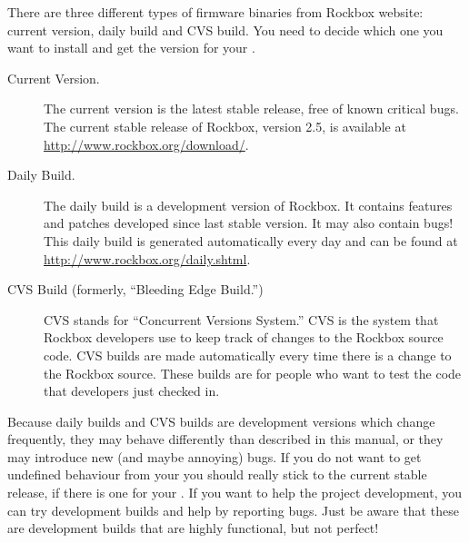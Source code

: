There are three different types of firmware binaries from Rockbox website:
\label{Version}
current version, daily build and CVS build. You need to decide which one
you want to install and get the version for your \dap{}.

\begin{description}

\item[Current Version.] The current version is the latest stable release, free
  of known critical bugs.  The current stable release of Rockbox, version 2.5,
  is available at \url{http://www.rockbox.org/download/}.

\item[Daily Build.] The daily build is a development version of Rockbox. It
  contains features and patches developed since last stable version.  It
  may also contain bugs! This daily build is generated automatically every day
  and can be found at \url{http://www.rockbox.org/daily.shtml}.

\item[CVS Build (formerly, ``Bleeding Edge Build.'')] CVS stands for
  ``Concurrent Versions System.'' CVS is the system that Rockbox
  developers use to keep track of changes to the Rockbox source code. CVS
  builds are made automatically every time there is a change to the
  Rockbox source. These builds are for people who want to test the code
  that developers just checked in.

\end{description}


Because daily builds and CVS builds are development versions which change
frequently, they may behave differently than described in this manual, or
they may introduce new (and maybe annoying) bugs. If you do not want to get
undefined behaviour from your \dap{} you should really stick to the current
stable release, if there is one for your \dap{}. If you want to help the
project development, you can try development builds and help by reporting
bugs. Just be aware that these are development builds that are  highly
functional, but not perfect!

